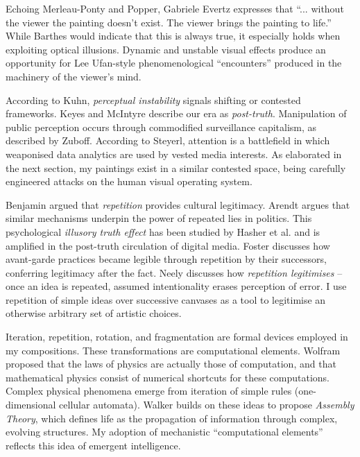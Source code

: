\documentclass[12pt]{article}
\begin{document}
Echoing Merleau-Ponty\autocite{merleauPonty1962phenomenology} and
Popper,\autocite{popper1972objective} Gabriele Evertz expresses that
``... without the viewer the painting doesn't exist. The viewer brings
the painting to life.''\autocite{evertz09documentary} While Barthes
would indicate that this is always true,\autocite{barthes1977death} it
especially holds when exploiting optical illusions. Dynamic and
unstable visual effects produce an opportunity for Lee Ufan-style
phenomenological ``encounters''\autocite[pp.~52--6]{encounter} produced in
the machinery of the viewer's mind.

According to Kuhn, \emph{perceptual instability} signals shifting or
contested frameworks.\autocite[p.~64]{kuhn1970structure}
Keyes\autocite{keyes2004posttruth} and
McIntyre\autocite{mcintyre2018posttruth} describe our era as
\emph{post-truth}. Manipulation of public perception occurs through
commodified surveillance capitalism, as described by
Zuboff.\autocite[pp.~8--12]{zuboff2019surveillance} According to
Steyerl,\autocite{steyerl2016sea} attention is a battlefield in which
weaponised data analytics are used by vested media interests. As
elaborated in the next section, my paintings exist in a similar
contested space, being carefully engineered attacks on the human visual
operating system.

Benjamin argued that \emph{repetition} provides cultural
legitimacy.\autocite{benjamin1935kunstwerk} Arendt argues that similar
mechanisms underpin the power of repeated lies in
politics.\autocite{arendt1972lying} This psychological \emph{illusory
  truth effect} has been studied by Hasher et
al.\autocite{hasher1977frequency} and is amplified in the
post-truth\autocite{keyes2004posttruth,mcintyre2018posttruth} circulation
of digital
media.\autocite{zuboff2019surveillance} Foster\autocite[pp.~29--30]{foster1996return}
discusses how avant-garde practices became legible through repetition
by their successors, conferring legitimacy after the fact. Neely
discusses how \emph{repetition legitimises} -- once an idea is repeated,
assumed intentionality erases perception of
error.\autocite{neely-repetition} I use repetition of simple ideas over
successive canvases as a tool to legitimise an otherwise arbitrary set
of artistic choices.

Iteration, repetition, rotation, and fragmentation are formal devices
employed in my compositions. These transformations are computational
elements. Wolfram proposed that the laws of physics
are actually those of computation, and that mathematical physics
consist of numerical shortcuts for these computations.\autocite{wolfram1984} Complex
physical phenomena emerge from iteration of simple rules
(one-dimensional cellular automata).\autocite{wolfram}
Walker builds on these ideas to propose
\emph{Assembly Theory}, which defines life as the propagation of
information through complex, evolving structures.\autocite{walker2024life} My adoption of
mechanistic ``computational elements'' reflects this idea of
emergent intelligence.
\end{document}
